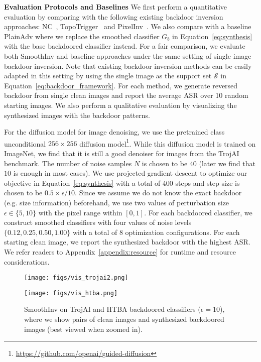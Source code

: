 \documentclass[10pt,twocolumn,letterpaper]{article}
\begin{document}
\noindent \textbf{Evaluation Protocols and Baselines} We first perform a quantitative evaluation by comparing with the following existing backdoor inversion approaches: NC~\cite{nc2019wang},  TopoTrigger~\cite{hu2022topo} and PixelInv~\cite{pixelinv}. We also compare with a baseline PlainAdv where we replace the smoothed classifier $G_{b}$ in Equation~\ref{eq:synthesis} with the base backdoored classifier instead. For a fair comparison, we evaluate both SmoothInv and baseline approaches under the same setting of single image backdoor inversion. Note that existing backdoor inversion methods can be easily adapted in this setting by using the single image as the support set $\mathcal{S}$ in Equation~\ref{eq:backdoor_framework}. For each method, we generate reversed backdoor from single clean images and report the average ASR over 10 random starting images. We also perform a qualitative evaluation by visualizing the synthesized images with the backdoor patterns.

For the diffusion model for image denoising, we use the pretrained class unconditional $256\times 256$ diffusion model\footnote{\url{https://github.com/openai/guided-diffusion}}. While this diffusion model is trained on ImageNet, we find that it is still a good denoiser for images from the TrojAI benchmark. The number of noise samples $N$ is chosen to be $40$ (later we find that $10$ is enough in most cases). We use projected gradient descent to optimize our objective in  Equation~\ref{eq:synthesis} with a total of 400 steps and step size is chosen to be $0.5\times\epsilon/10$. Since we assume we do not know the exact backdoor (e.g. size information) beforehand, we use two values of perturbation size $\epsilon\in\{5,10\}$ with the pixel range within $[0,1]$. For each backdoored classifier, we construct smoothed classifiers with four values of noise levels $\{0.12,0.25,0.50,1.00\}$ with a total of 8 optimization configurations. For each starting clean image, we report the synthesized backdoor with the  highest ASR. We refer readers to Appendix~\ref{appendix:resource} for runtime and resource considerations.

\begin{figure*}[htbp]
\centering 
        \begin{minipage}[]{0.495\linewidth} \label{fig:vis_exp_trojai_htba_a}
        {\texttt{[image: figs/vis\_trojai2.png]}}
        \end{minipage} 
        \begin{minipage}[]{0.495\linewidth}
        {\texttt{[image: figs/vis\_htba.png]}}
        \label{fig:vis_exp_trojai_htba_b}
        \end{minipage}
    \caption{SmoothInv on TrojAI and HTBA backdoored classifiers ($\epsilon=10$), where we show pairs of clean images and synthesized backdoored images (best viewed when zoomed in).}
    \label{fig:vis_exp_trojai_htba}
\end{figure*}
\end{document}
